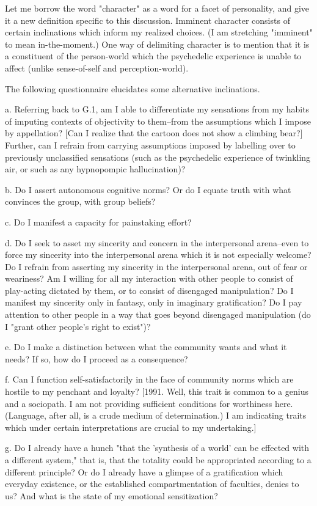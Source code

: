 Let me borrow the word "character" as a word for a facet of personality, and give it a new definition specific to this discussion. Imminent character consists of certain inclinations which inform my realized choices. (I am stretching "imminent" to mean in-the-moment.) One way of delimiting character is to mention that it is a constituent of the person-world which the psychedelic experience is unable to affect (unlike sense-of-self and perception-world).

The following questionnaire elucidates some alternative inclinations.

a. Referring back to G.1, am I able to differentiate my sensations from my habits of imputing contexts of objectivity to them--from the assumptions which I impose by appellation? [Can I realize that the cartoon does not show a climbing bear?] Further, can I refrain from carrying assumptions imposed by labelling over to previously unclassified sensations (such as the psychedelic experience of twinkling air, or such as any hypnopompic hallucination)?

b. Do I assert autonomous cognitive norms? Or do I equate truth with what convinces the group, with group beliefs?

c. Do I manifest a capacity for painstaking effort?

d. Do I seek to asset my sincerity and concern in the interpersonal arena--even to force my sincerity into the interpersonal arena which it is not especially welcome? Do I refrain from asserting my sincerity in the interpersonal arena, out of fear or weariness? Am I willing for all my interaction with other people to consist of play-acting dictated by them, or to consist of disengaged manipulation? Do I manifest my sincerity only in fantasy, only in imaginary gratification? Do I pay attention to other people in a way that goes beyond disengaged manipulation (do I "grant other people's right to exist")?

e. Do I make a distinction between what the community wants and what it needs? If so, how do I proceed as a consequence?

f. Can I function self-satisfactorily in the face of community norms which are hostile to my penchant and loyalty? [1991. Well, this trait is common to a genius and a sociopath. I am not providing sufficient conditions for worthiness here. (Language, after all, is a crude medium of determination.) I am indicating traits which under certain interpretations are crucial to my undertaking.]

g. Do I already have a hunch "that the 'synthesis of a world' can be effected with a different system," that is, that the totality could be appropriated according to a different principle? Or do I already have a glimpse of a gratification which everyday existence, or the established compartmentation of faculties, denies to us? And what is the state of my emotional sensitization?

